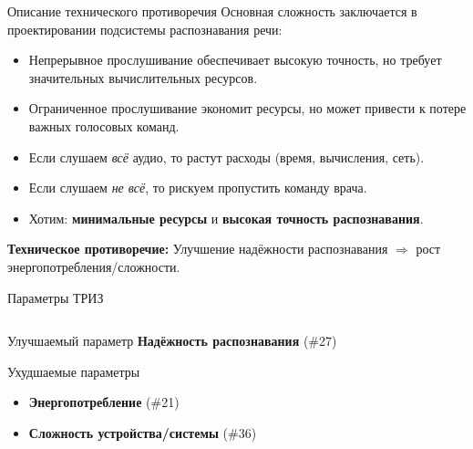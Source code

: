 \documentclass[aspectratio=169]{beamer}
\begin{document}
\begin{frame}{Описание технического противоречия}
  Основная сложность заключается в проектировании подсистемы распознавания речи:
  \begin{itemize}
    \item Непрерывное прослушивание обеспечивает высокую точность, но требует значительных вычислительных ресурсов.
    \item Ограниченное прослушивание экономит ресурсы, но может привести к потере важных голосовых команд.
  \end{itemize}
  \bigskip
  \begin{itemize}
    \item Если слушаем \emph{всё} аудио, то растут расходы (время, вычисления, сеть).
    \item Если слушаем \emph{не всё}, то рискуем пропустить команду врача.
    \item Хотим: \textbf{минимальные ресурсы} и \textbf{высокая точность распознавания}.
  \end{itemize}
  \bigskip
  \textbf{Техническое противоречие:} Улучшение надёжности распознавания \(\Rightarrow\) рост энергопотребления/сложности.
\end{frame}



\begin{frame}{Параметры ТРИЗ}
    \begin{columns}[T,onlytextwidth]
      \begin{column}{0.45\textwidth}
        \begin{block}{Улучшаемый параметр}
          \textbf{Надёжность распознавания} (\#27)
        \end{block}
        \begin{block}{Ухудшаемые параметры}
          \begin{itemize}
            \item \textbf{Энергопотребление} (\#21)
            \item \textbf{Сложность устройства/системы} (\#36)
          \end{itemize}
        \end{block}
      \end{column}
      \begin{column}{0.55\textwidth}
        \centering
      \end{column}
    \end{columns}
\end{frame}
\end{document}
